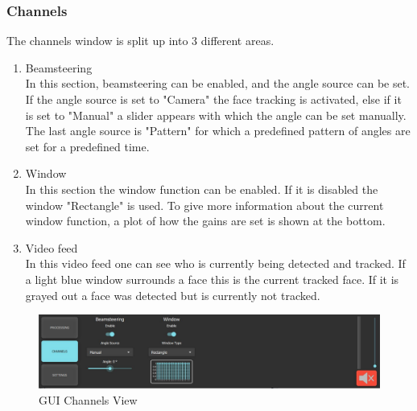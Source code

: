 \subsubsection{Channels}
The channels window is split up into 3 different areas.
\begin{enumerate}
    \item Beamsteering \\
    In this section, beamsteering can be enabled, and the angle source can be set. If the angle source is set to "Camera" the face tracking is activated, else if it is set to "Manual" a slider appears with which the angle can be set manually. The last angle source is "Pattern" for which a predefined pattern of angles are set for a predefined time. 
    \item Window \\
    In this section the window function can be enabled. If it is disabled the window "Rectangle" is used. To give more information about the current window function, a plot of how the gains are set is shown at the bottom.
    \item Video feed \\
    In this video feed one can see who is currently being detected and tracked. If a light blue window surrounds a face this is the current tracked face. If it is grayed out a face was detected but is currently not tracked.
\end{enumerate}
\begin{figure}[h!]
    \centering
    \includegraphics[width=\textwidth]{images/4_Design/GUI_Channels.JPG}
    \caption{GUI Channels View}
    \label{4_fig:gui_channels}
\end{figure}

